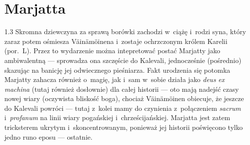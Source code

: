 \documentclass[11pt,a4paper,twoside]{report}
\begin{document}
\vspace*{\baselineskip}
\section{Marjatta}
\begin{spacing}{1.3}
Skromna dziewczyna za sprawą borówki zachodzi w~ciążę i~rodzi syna, który zaraz potem ośmiesza Väinämöinena i~zostaje ochrzczonym królem Karelii (por.~L). Przez to wydarzenie można intepretować postać Marjatty jako ambiwalentną --- sprowadza ona szczęście do Kalevali, jednocześnie (pośrednio) skazując na banicję jej odwiecznego pieśniarza. Fakt urodzenia się potomka Marjatty zahacza również o~magię, jak i~sam w~sobie działa jako \emph{deus ex machina} (tutaj również dosłownie) dla całej historii --- oto mają nadejść czasy nowej wiary (oczywista bliskość boga), chociaż Väinämöinen obiecuje, że jeszcze do Kalevali powróci --- tutaj z~kolei mamy do czynienia z~połączeniem \emph{sacrum} i~\emph{profanum} na linii wiary pogańskiej i~chrześcijańskiej. Marjatta jest zatem tricksterem ukrytym i~skoncentrowanym, ponieważ jej historii poświęcono tylko jedno runo eposu --- ostatnie.
\end{spacing}
\end{document}
